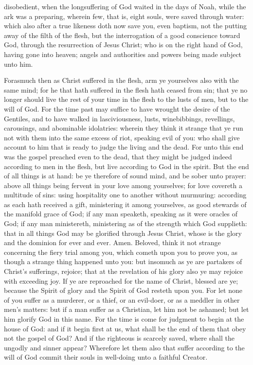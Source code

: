 disobedient, when the longsuffering of God waited in the days of Noah, while the ark was a preparing, wherein few, that is, eight souls, were saved through water: which also after a true likeness doth now save you, even baptism, not the putting away of the filth of the flesh, but the interrogation of a good conscience toward God, through the resurrection of Jesus Christ; who is on the right hand of God, having gone into heaven; angels and authorities and powers being made subject unto him. 

Forasmuch then as Christ suffered in the flesh, arm ye yourselves also with the same mind; for he that hath suffered in the flesh hath ceased from sin; that ye no longer should live the rest of your time in the flesh to the lusts of men, but to the will of God. For the time past may suffice to have wrought the desire of the Gentiles, and to have walked in lasciviousness, lusts, winebibbings, revellings, carousings, and abominable idolatries: wherein they think it strange that ye run not with them into the same excess of riot, speaking evil of you: who shall give account to him that is ready to judge the living and the dead. For unto this end was the gospel preached even to the dead, that they might be judged indeed according to men in the flesh, but live according to God in the spirit.  But the end of all things is at hand: be ye therefore of sound mind, and be sober unto prayer: above all things being fervent in your love among yourselves; for love covereth a multitude of sins: using hospitality one to another without murmuring: according as each hath received a gift, ministering it among yourselves, as good stewards of the manifold grace of God; if any man speaketh, speaking as it were oracles of God; if any man ministereth, ministering as of the strength which God supplieth: that in all things God may be glorified through Jesus Christ, whose is the glory and the dominion for ever and ever. Amen.  Beloved, think it not strange concerning the fiery trial among you, which cometh upon you to prove you, as though a strange thing happened unto you: but insomuch as ye are partakers of Christ’s sufferings, rejoice; that at the revelation of his glory also ye may rejoice with exceeding joy. If ye are reproached for the name of Christ, blessed are ye; because the Spirit of glory and the Spirit of God resteth upon you. For let none of you suffer as a murderer, or a thief, or an evil-doer, or as a meddler in other men’s matters: but if a man suffer as a Christian, let him not be ashamed; but let him glorify God in this name. For the time is come for judgment to begin at the house of God: and if it begin first at us, what shall be the end of them that obey not the gospel of God? And if the righteous is scarcely saved, where shall the ungodly and sinner appear? Wherefore let them also that suffer according to the will of God commit their souls in well-doing unto a faithful Creator. 

